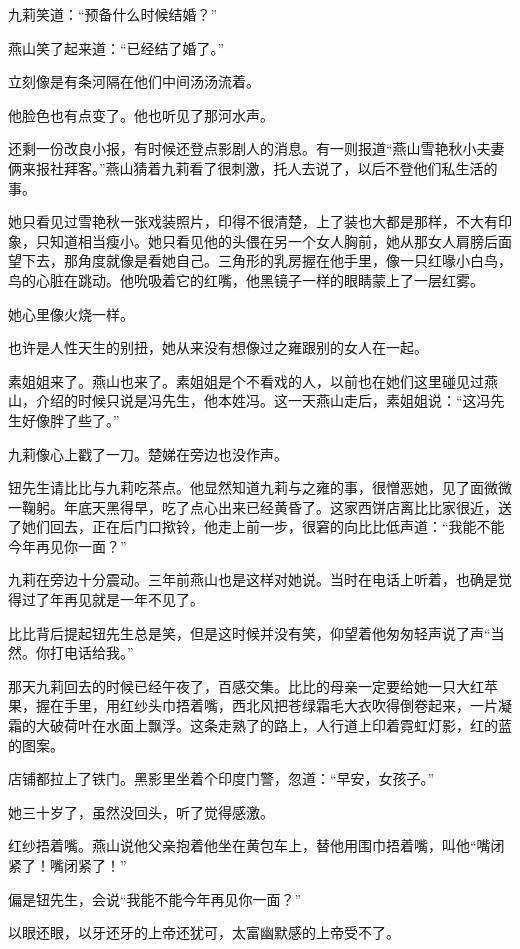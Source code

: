 \par 九莉笑道：“预备什么时候结婚？”
\par 燕山笑了起来道：“已经结了婚了。”
\par 立刻像是有条河隔在他们中间汤汤流着。
\par 他脸色也有点变了。他也听见了那河水声。
\par 还剩一份改良小报，有时候还登点影剧人的消息。有一则报道“燕山雪艳秋小夫妻俩来报社拜客。”燕山猜着九莉看了很刺激，托人去说了，以后不登他们私生活的事。
\par 她只看见过雪艳秋一张戏装照片，印得不很清楚，上了装也大都是那样，不大有印象，只知道相当瘦小。她只看见他的头偎在另一个女人胸前，她从那女人肩膀后面望下去，那角度就像是看她自己。三角形的乳房握在他手里，像一只红喙小白鸟，鸟的心脏在跳动。他吮吸着它的红嘴，他黑镜子一样的眼睛蒙上了一层红雾。
\par 她心里像火烧一样。
\par 也许是人性天生的别扭，她从来没有想像过之雍跟别的女人在一起。
\par 素姐姐来了。燕山也来了。素姐姐是个不看戏的人，以前也在她们这里碰见过燕山，介绍的时候只说是冯先生，他本姓冯。这一天燕山走后，素姐姐说：“这冯先生好像胖了些了。”
\par 九莉像心上戳了一刀。楚娣在旁边也没作声。
\par 钮先生请比比与九莉吃茶点。他显然知道九莉与之雍的事，很憎恶她，见了面微微一鞠躬。年底天黑得早，吃了点心出来已经黄昏了。这家西饼店离比比家很近，送了她们回去，正在后门口揿铃，他走上前一步，很窘的向比比低声道：“我能不能今年再见你一面？”
\par 九莉在旁边十分震动。三年前燕山也是这样对她说。当时在电话上听着，也确是觉得过了年再见就是一年不见了。
\par 比比背后提起钮先生总是笑，但是这时候并没有笑，仰望着他匆匆轻声说了声“当然。你打电话给我。”
\par 那天九莉回去的时候已经午夜了，百感交集。比比的母亲一定要给她一只大红苹果，握在手里，用红纱头巾捂着嘴，西北风把苍绿霜毛大衣吹得倒卷起来，一片凝霜的大破荷叶在水面上飘浮。这条走熟了的路上，人行道上印着霓虹灯影，红的蓝的图案。
\par 店铺都拉上了铁门。黑影里坐着个印度门警，忽道：“早安，女孩子。”
\par 她三十岁了，虽然没回头，听了觉得感激。
\par 红纱捂着嘴。燕山说他父亲抱着他坐在黄包车上，替他用围巾捂着嘴，叫他“嘴闭紧了！嘴闭紧了！”
\par 偏是钮先生，会说“我能不能今年再见你一面？”
\par 以眼还眼，以牙还牙的上帝还犹可，太富幽默感的上帝受不了。
